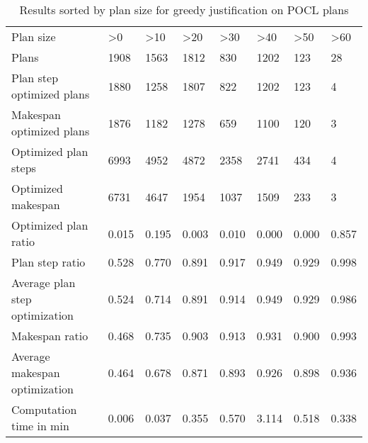 \begin{table}[]
    \begin{tabular}{llllllll}
    \cline{1-8}
    Plan size                     & \textgreater{}0 & \textgreater{}10 & \textgreater{}20 & \textgreater{}30 & \textgreater{}40 & \textgreater{}50 & \textgreater{}60 \\ \cline{1-8}
    Plans                          & 1908            & 1563             & 1812             & 830              & 1202             & 123              & 28               \\
    Plan step optimized plans      & 1880            & 1258             & 1807             & 822              & 1202             & 123              & 4                \\
    Makespan optimized plans       & 1876            & 1182             & 1278             & 659              & 1100             & 120              & 3                \\
    Optimized plan steps           & 6993            & 4952             & 4872             & 2358             & 2741             & 434              & 4                \\
    Optimized makespan             & 6731            & 4647             & 1954             & 1037             & 1509             & 233              & 3                \\
    Optimized plan ratio           & 0.015           & 0.195            & 0.003            & 0.010            & 0.000            & 0.000            & 0.857            \\
    Plan step ratio                & 0.528           & 0.770            & 0.891            & 0.917            & 0.949            & 0.929            & 0.998            \\
    Average plan step optimization & 0.524           & 0.714            & 0.891            & 0.914            & 0.949            & 0.929            & 0.986            \\
    Makespan ratio                 & 0.468           & 0.735            & 0.903            & 0.913            & 0.931            & 0.900            & 0.993            \\
    Average makespan optimization  & 0.464           & 0.678            & 0.871            & 0.893            & 0.926            & 0.898            & 0.936            \\
    Computation time in min        & 0.006           & 0.037            & 0.355            & 0.570            & 3.114            & 0.518            & 0.338           
    \end{tabular}
    \caption{Results sorted by plan size for greedy justification on POCL plans}
\end{table}
